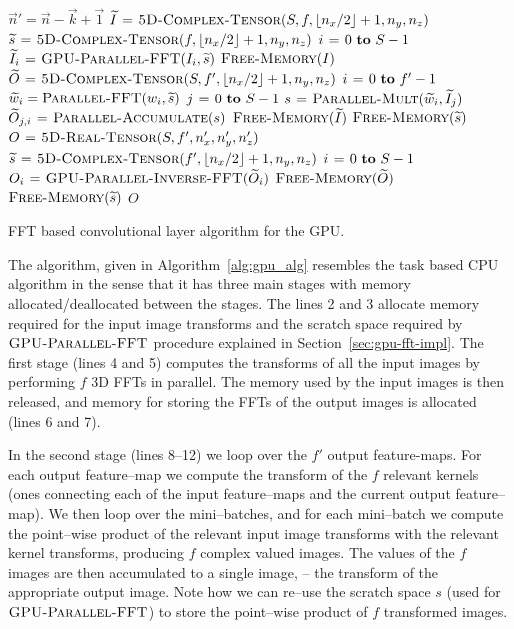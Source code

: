 \documentclass[conference]{IEEEtran}
\DeclarePairedDelimiter{\floor}{\lfloor}{\rfloor}
\begin{document}
  \begin{algorithm}
    {\small
    \begin{codebox}
      \li $\vec{n}' = \vec{n} - \vec{k} + \vec{1}$
      \li $\widetilde{I} \gets \proc{5D-Complex-Tensor}(S,f,\floor{n_x/2}+1,n_y,n_z)$
      \li $\widetilde{s} \gets \proc{5D-Complex-Tensor}(f,\floor{n_x/2}+1,n_y,n_z)$
      \li \For $i \gets 0 \To S-1$
      \li   \Do $\widetilde{I}_{i} \mathrel{\hspace{1pt}=\hspace{1pt}} \textnormal{\scshape GPU-Parallel-FFT}(I_{i},\widetilde{s})$
      \End
      \li $\textnormal{\scshape Free-Memory}(I)$
      \li $\widetilde{O} \gets \proc{5D-Complex-Tensor}(S,f',\floor{n_x/2}+1,n_y,n_z)$
      \li \For $i \gets 0 \To f'-1$
      \li    \Do $\widetilde{w}_{i} = \textnormal{\scshape Parallel-FFT}(w_{i},\widetilde{s})$
      \li        \For $j \gets 0 \To S-1$
      \li           \Do $s \mathrel{\hspace{1pt}=\hspace{1pt}} \textnormal{\scshape Parallel-Mult}(\widetilde{w}_{i}, \widetilde{I}_{j})$
      \li               $\widetilde{O}_{j,i} \mathrel{\hspace{1pt}=\hspace{1pt}} \textnormal{\scshape Parallel-Accumulate}(s)$
      \End \End
      \li $\textnormal{\scshape Free-Memory}(\widetilde{I})$
      \li $\textnormal{\scshape Free-Memory}(\widetilde{s})$
      \li $O \mathrel{\hspace{1pt}=\hspace{1pt}} \textnormal{\scshape5D-Real-Tensor}(S,f',n'_x,n'_y,n'_z)$
      \li $\widetilde{s} \gets \proc{5D-Complex-Tensor}(f',\floor{n_x/2}+1,n_y,n_z)$
      \li \For $i \gets 0 \To S-1$
      \li   \Do $O_{i} \mathrel{\hspace{1pt}=\hspace{1pt}} \textnormal{\scshape GPU-Parallel-Inverse-FFT}(\widetilde{O}_{i})$
      \End
      \li $\textnormal{\scshape Free-Memory}(\widetilde{O})$
      \li $\textnormal{\scshape Free-Memory}(\widetilde{s})$
      \li \Return $O$
    \end{codebox}
    }

    \caption{FFT based convolutional layer algorithm for the GPU.}
    \label{alg:gpu_alg}
  \end{algorithm}

  The algorithm, given in Algorithm~\ref{alg:gpu_alg} resembles the
  task based CPU algorithm in the sense that it has three main stages
  with memory allocated/deallocated between the stages.  The lines 2
  and 3 allocate memory required for the input image transforms and
  the scratch space required by $\textnormal{\scshape GPU-Parallel-FFT}$ procedure
  explained in Section~\ref{sec:gpu-fft-impl}.  The first stage (lines
  4 and 5) computes the transforms of all the input images by
  performing $f$ 3D FFTs in parallel.  The memory used by the input
  images is then released, and memory for storing the FFTs of the
  output images is allocated (lines 6 and 7).

  In the second stage (lines 8--12) we loop over the $f'$ output
  feature-maps.  For each output feature--map we compute the transform
  of the $f$ relevant kernels (ones connecting each of the input
  feature--maps and the current output feature--map).  We then loop
  over the mini--batches, and for each mini--batch we compute the
  point--wise product of the relevant input image transforms with the
  relevant kernel transforms, producing $f$ complex valued images.
  The values of the $f$ images are then accumulated to a single image,
  -- the transform of the appropriate output image.  Note how we can
  re--use the scratch space $s$ (used for $\textnormal{\scshape GPU-Parallel-FFT}$)
  to store the point--wise product of $f$ transformed images.
\end{document}
